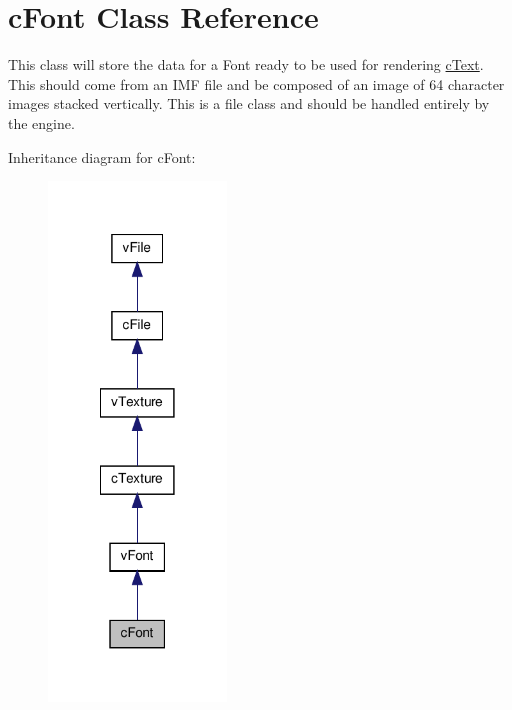 \hypertarget{classc_font}{
\section{cFont Class Reference}
\label{classc_font}
}


This class will store the data for a Font ready to be used for rendering \hyperlink{classc_text}{cText}. This should come from an IMF file and be composed of an image of 64 character images stacked vertically. This is a file class and should be handled entirely by the engine.  




Inheritance diagram for cFont:
\nopagebreak
\begin{figure}[H]
\begin{center}
\leavevmode
\includegraphics[width=134pt]{classc_font__inherit__graph}
\end{center}
\end{figure}


